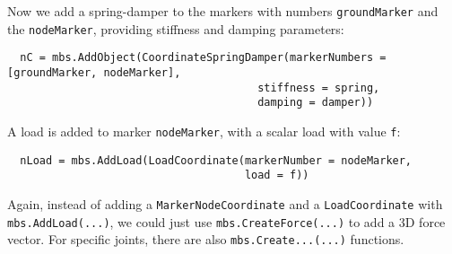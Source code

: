 Now we add a spring-damper to the markers with numbers \texttt{groundMarker} and the \texttt{nodeMarker}, providing stiffness and damping parameters:
\pythonstyle\begin{lstlisting}
  nC = mbs.AddObject(CoordinateSpringDamper(markerNumbers = [groundMarker, nodeMarker], 
                                       stiffness = spring, 
                                       damping = damper)) 
\end{lstlisting}
%
A load is added to marker \texttt{nodeMarker}, with a scalar load with value \texttt{f}:
\pythonstyle\begin{lstlisting}
  nLoad = mbs.AddLoad(LoadCoordinate(markerNumber = nodeMarker, 
                                     load = f))
\end{lstlisting}
Again, instead of adding a \texttt{MarkerNodeCoordinate} and a \texttt{LoadCoordinate} with \texttt{mbs.AddLoad(...)},
we could just use \texttt{mbs.CreateForce(...)} to add a 3D force vector.
For specific joints, there are also \texttt{mbs.Create...(...)} functions.

